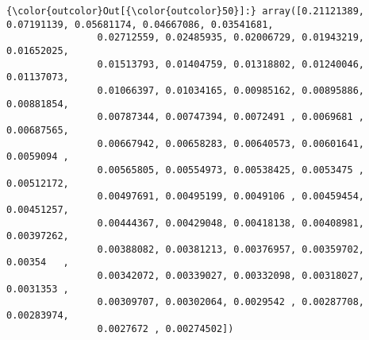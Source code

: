 \documentclass[11pt]{article}
\begin{document}
\begin{Verbatim}[commandchars=\\\{\}]
{\color{outcolor}Out[{\color{outcolor}50}]:} array([0.21121389, 0.07191139, 0.05681174, 0.04667086, 0.03541681,
                0.02712559, 0.02485935, 0.02006729, 0.01943219, 0.01652025,
                0.01513793, 0.01404759, 0.01318802, 0.01240046, 0.01137073,
                0.01066397, 0.01034165, 0.00985162, 0.00895886, 0.00881854,
                0.00787344, 0.00747394, 0.0072491 , 0.0069681 , 0.00687565,
                0.00667942, 0.00658283, 0.00640573, 0.00601641, 0.0059094 ,
                0.00565805, 0.00554973, 0.00538425, 0.0053475 , 0.00512172,
                0.00497691, 0.00495199, 0.0049106 , 0.00459454, 0.00451257,
                0.00444367, 0.00429048, 0.00418138, 0.00408981, 0.00397262,
                0.00388082, 0.00381213, 0.00376957, 0.00359702, 0.00354   ,
                0.00342072, 0.00339027, 0.00332098, 0.00318027, 0.0031353 ,
                0.00309707, 0.00302064, 0.0029542 , 0.00287708, 0.00283974,
                0.0027672 , 0.00274502])
\end{Verbatim}
            
    \begin{center}
    \end{center}
    { \hspace*{\fill} \\}
    
\end{document}
